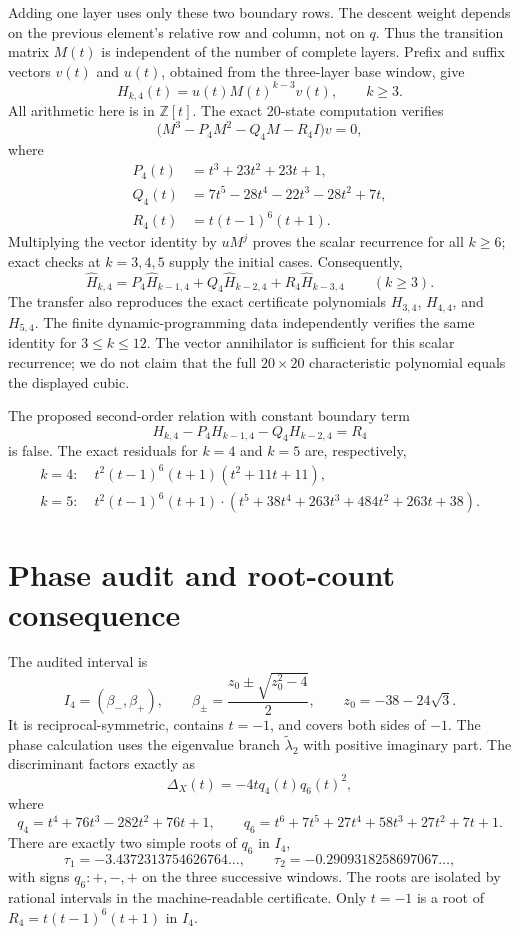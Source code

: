 \documentclass[11pt]{article}
\begin{document}
Adding one layer uses only these two boundary rows. The descent weight
depends on the previous element's relative row and column, not on $q$.
Thus the transition matrix $M(t)$ is independent of the number of
complete layers. Prefix and suffix vectors $v(t)$ and $u(t)$, obtained
from the three-layer base window, give
\[
  H_{k,4}(t)=u(t)M(t)^{k-3}v(t),\qquad k\geq3.
\]
All arithmetic here is in $\mathbb Z[t]$. The exact 20-state computation
verifies
\[
  \bigl(M^3-P_4M^2-Q_4M-R_4I\bigr)v=0,
\]
where
\[
\begin{aligned}
P_4(t)&=t^3+23t^2+23t+1,\\
Q_4(t)&=7t^5-28t^4-22t^3-28t^2+7t,\\
R_4(t)&=t(t-1)^6(t+1).
\end{aligned}
\]
Multiplying the vector identity by $uM^j$ proves the scalar recurrence
for all $k\geq6$; exact checks at $k=3,4,5$ supply the initial cases.
Consequently,
\[
  \widehat H_{k,4}
  =P_4\widehat H_{k-1,4}
   +Q_4\widehat H_{k-2,4}
   +R_4\widehat H_{k-3,4}
  \qquad(k\geq3).
\]
The transfer also reproduces the exact certificate polynomials
$H_{3,4}$, $H_{4,4}$, and $H_{5,4}$. The finite dynamic-programming
data independently verifies the same identity for $3\leq k\leq12$.
The vector annihilator is sufficient for this scalar recurrence; we do
not claim that the full $20\times20$ characteristic polynomial equals
the displayed cubic.

The proposed second-order relation with constant boundary term
\[
H_{k,4}-P_4H_{k-1,4}-Q_4H_{k-2,4}=R_4
\]
is false. The exact residuals for $k=4$ and $k=5$ are, respectively,
\[
\begin{aligned}
k=4:\;&t^2(t-1)^6(t+1)(t^2+11t+11),\\
k=5:\;&t^2(t-1)^6(t+1)\cdot
(t^5+38t^4+263t^3+484t^2+263t+38).
\end{aligned}
\]

\section{Phase audit and root-count consequence}
The audited interval is
\[
 I_4=(\beta_-,\beta_+),\qquad
 \beta_\pm=\frac{z_0\pm\sqrt{z_0^2-4}}2,\qquad
 z_0=-38-24\sqrt3.
\]
It is reciprocal-symmetric, contains $t=-1$, and covers both sides of
$-1$. The phase calculation uses the eigenvalue branch
\(\widetilde\lambda_2\) with positive imaginary part. The discriminant
factors exactly as
\[
\Delta_X(t)=-4tq_4(t)q_6(t)^2,
\]
where
\[
 q_4=t^4+76t^3-282t^2+76t+1,\qquad
 q_6=t^6+7t^5+27t^4+58t^3+27t^2+7t+1.
\]
There are exactly two simple roots of $q_6$ in $I_4$,
\[
 \tau_1=-3.4372313754626764\ldots,\qquad
 \tau_2=-0.2909318258697067\ldots,
\]
with signs $q_6:+,-,+$ on the three successive windows. The roots are
isolated by rational intervals in the machine-readable certificate.
Only $t=-1$ is a root of $R_4=t(t-1)^6(t+1)$ in $I_4$.
\end{document}

